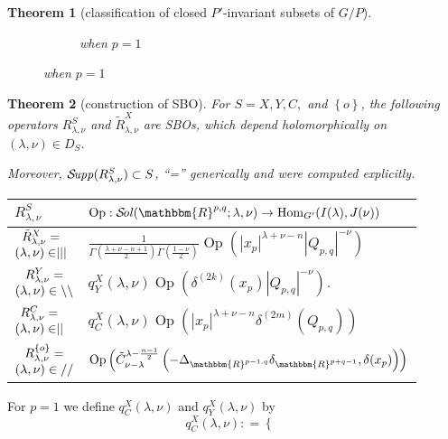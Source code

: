 \documentclass[portrait,final,paperwidth=90cm,paperheight=120cm,fontscale=0.3]{baposter}
\newcommand{\tmop}[1]{\ensuremath{\operatorname{#1}}}
\newtheorem{theorem}{Theorem}
\newcommand{\Sol}{\mathcal{S}\!{\it ol}}
\newcommand{\Supp}{\mathcal{S}\!{\it upp}}
\theoremstyle{definition}
\renewcommand{\Q}{Q_{p,q}}
\newcommand{\mm}{\mid\mid}
\newcommand{\bb}{\backslash\backslash}
\renewcommand{\ss}{//}
\begin{document}
\begin{poster}
{\begin{theorem}[classification of closed $P'$-invariant subsets of $G/P$]
\begin{figure}[H]
\begin{subfigure}[t]{0.3\textwidth}
	\caption{when $p=1$}
    \end{subfigure}
\end{figure}
\end{theorem}
 }
 {
\begin{theorem}[construction of SBO]\label{thm:construction}
	For $S=X,Y,C,$ and $\left\{ o \right\}$, the following operators $R_{\lambda,\nu}^S$ and $\tilde{R}_{\lambda,\nu}^X$ are SBOs, which depend holomorphically on $(\lambda,\nu)\in D_S$. 
	
	Moreover, $\Supp(R_{\lambda,\nu}^S)\subset S$, ``='' generically and were computed explicitly.\\
	\newcommand{\mystack}[2]{\begin{array}{@{}c@{}}#1\\#2\end{array}}
	\begin{tabular}{@{}|@{}b{1.6cm}@{}|@{}l@{}|}
  \hline
  $R_{\lambda,\nu}^S$& $\tmop{Op} : 
  \Sol(\mathbbm{R}^{p, q} ; \lambda, \nu)
  \rightarrow \tmop{Hom}_{G'} (I (\lambda), J (\nu))$\\
  \hline
  $\mystack{\tilde{R}^X_{\lambda, \nu} =}{(\lambda,\nu)\in\mid\mid\mid}$ & $\frac{1}{\Gamma \left( \frac{\lambda + \nu - n + 1}{2}
  \right) \Gamma \left( \frac{1 - \nu}{2} \right)}{\tmop{Op} \left( | x_p |^{\lambda +
  \nu - n} | \Q |^{- \nu}\right)} $ \\
  \hline
  $\mystack{R_{\lambda, \nu}^Y =}{(\lambda,\nu)\in\bb}$ & ${ q_Y^X (\lambda, \nu)}{\tmop{Op} \left( \delta^{(2k)}(x_p)
  | \Q |^{- \nu}  \right)}$.\\
  \hline
  $\mystack{R_{\lambda, \nu}^C =}{(\lambda,\nu)\in\mm}$ & $q_C^X (\lambda, \nu){\tmop{Op} \left( | x_p |^{\lambda + \nu - n}\delta^{(2m)}\left( \Q \right)
    \right)}$ \\
  \hline
  $\mystack{R_{\lambda, \nu}^{\{ o \}} =}{(\lambda,\nu)\in\ss}$ & 
  $\tmop{Op} \left( \tilde{C}_{\nu -
  \lambda}^{\lambda - \frac{n - 1}{2}} \left(-\Delta_{\mathbbm{R}^{p - 1, q}}
  \delta_{\mathbbm{R}^{p + q - 1}}, \delta (x_p)\right) \right)$\\
  \hline
\end{tabular}
\end{theorem}
For $p=1$ we define $q_C^X(\lambda,\nu)$ and $q_Y^X(\lambda,\nu)$ by
\[ q_C^X (\lambda, \nu) : = \left\{ \begin{array}{ll}

\end{array}\]}
\end{poster}
\end{document}
